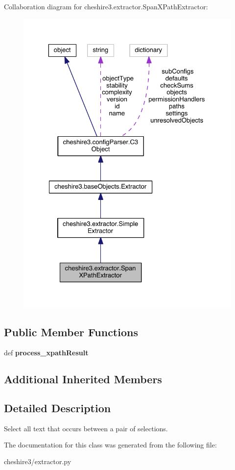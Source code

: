 Collaboration diagram for cheshire3.\-extractor.\-Span\-X\-Path\-Extractor\-:
\nopagebreak
\begin{figure}[H]
\begin{center}
\leavevmode
\includegraphics[width=325pt]{classcheshire3_1_1extractor_1_1_span_x_path_extractor__coll__graph}
\end{center}
\end{figure}
\subsection*{Public Member Functions}
\begin{DoxyCompactItemize}
\item 
\hypertarget{classcheshire3_1_1extractor_1_1_span_x_path_extractor_abb18897b95d0cb115369f3beef9ef41f}{def {\bfseries process\-\_\-xpath\-Result}}\label{classcheshire3_1_1extractor_1_1_span_x_path_extractor_abb18897b95d0cb115369f3beef9ef41f}

\end{DoxyCompactItemize}
\subsection*{Additional Inherited Members}


\subsection{Detailed Description}
\begin{DoxyVerb}Select all text that occurs between a pair of selections.\end{DoxyVerb}
 

The documentation for this class was generated from the following file\-:\begin{DoxyCompactItemize}
\item 
cheshire3/extractor.\-py\end{DoxyCompactItemize}
